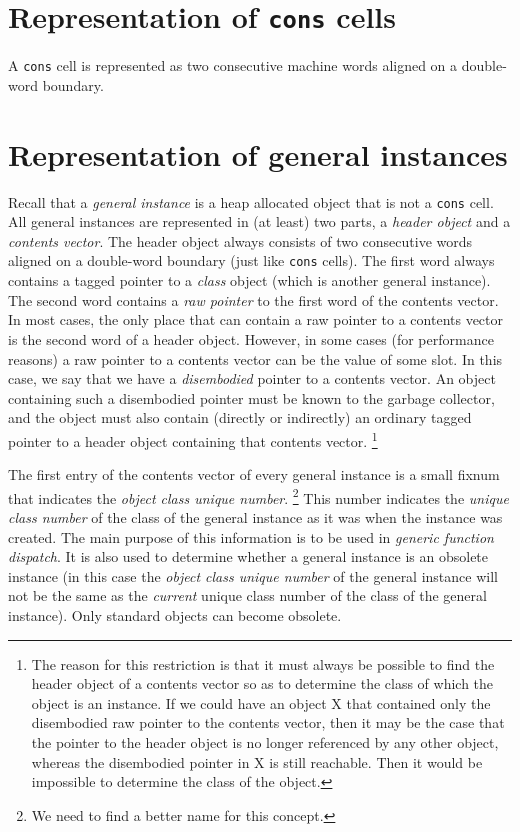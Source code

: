 \section{Representation of \texttt{cons} cells}

A \texttt{cons} cell is represented as two consecutive machine
words aligned on a double-word boundary.

\section{Representation of general instances}
\label{sec-data-representation-general-instances}

Recall that a \emph{general instance} is a heap allocated object that
is not a \texttt{cons} cell.  
All general instances are represented in (at
least) two parts, a \emph{header object} and a \emph{contents vector}.
The header object always consists of two consecutive words aligned on
a double-word boundary (just like \texttt{cons} cells).  The first
word always contains a tagged pointer to a \emph{class} object (which
is another general instance).  The second word contains a \emph{raw
  pointer} to the first word of the contents vector.  In most cases,
the only place that can contain a raw pointer to a contents vector is
the second word of a header object.  However, in some cases (for
performance reasons) a raw pointer to a contents vector can be the
value of some slot.  In this case, we say that we have a
\emph{disembodied} pointer to a contents vector.  An object containing
such a disembodied pointer must be known to the garbage collector, and
the object must also contain (directly or indirectly) an ordinary
tagged \cl{} pointer to a header object containing that contents
vector.%
\footnote{The reason for this restriction is that it must always be possible
  to find the header object of a contents vector so as to determine
  the class of which the object is an instance.  If we could have
  an object X that contained only the disembodied raw pointer to the
  contents vector, then it may be the case that the pointer to the
  header object is no longer referenced by any other object, whereas
  the disembodied pointer in X is still reachable.  Then it would be
  impossible to determine the class of the object.}

The first entry of the contents vector of every general instance is a
small fixnum that indicates the \emph{object class unique number}.%
\footnote{We need to find a better name for this concept.}
This number indicates the \emph{unique class number} of the class of
the general instance as it was when the instance was created.  The main
purpose of this information is to be used in \emph{generic function
  dispatch}.  It is also
used to determine whether a general instance is an obsolete instance (in
this case the \emph{object class unique number} of the general instance
will not be the same as the \emph{current} unique class number of the
class of the general instance).  Only standard objects can become
obsolete. 

